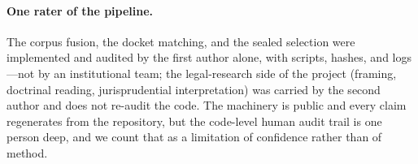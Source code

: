 \paragraph{One rater of the pipeline.}
The corpus fusion, the docket matching, and the sealed selection
were implemented and audited by the first author alone, with
scripts, hashes, and logs---not by an institutional team; the
legal-research side of the project (framing, doctrinal reading,
jurisprudential interpretation) was carried by the second author
and does not re-audit the code.
The machinery is public and every claim regenerates from the
repository, but the code-level human audit trail is one person
deep, and we count that as a limitation of confidence rather than
of method.
